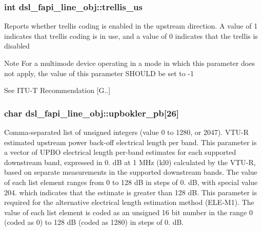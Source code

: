 \hypertarget{structdsl__fapi__line__obj_abb8859a3b3856147be87ac8e0ae7e49a}{
\subsubsection[{trellis\-\_\-us}]{\setlength{\rightskip}{0pt plus 5cm}int dsl\-\_\-fapi\-\_\-line\-\_\-obj\-::trellis\-\_\-us}}\label{structdsl__fapi__line__obj_abb8859a3b3856147be87ac8e0ae7e49a}
Reports whether trellis coding is enabled in the upstream direction. A value of 1 indicates that trellis coding is in use, and a value of 0 indicates that the trellis is disabled \begin{DoxyNote}{Note}
For a multimode device operating in a mode in which this parameter does not apply, the value of this parameter S\-H\-O\-U\-L\-D be set to -\/1 

See I\-T\-U-\/\-T Recommendation \mbox{[}G..\mbox{]} 
\end{DoxyNote}
\hypertarget{structdsl__fapi__line__obj_ae81094c7b07809194b99fac381bb297e}{
\subsubsection[{upbokler\-\_\-pb}]{\setlength{\rightskip}{0pt plus 5cm}char dsl\-\_\-fapi\-\_\-line\-\_\-obj\-::upbokler\-\_\-pb\mbox{[}26\mbox{]}}}\label{structdsl__fapi__line__obj_ae81094c7b07809194b99fac381bb297e}
Comma-\/separated list of unsigned integers (value 0 to 1280, or 2047). V\-T\-U-\/\-R estimated upstream power back-\/off electrical length per band. This parameter is a vector of U\-P\-B\-O electrical length per-\/band estimates for each supported downstream band, expressed in 0. d\-B at 1 M\-Hz (kl0) calculated by the V\-T\-U-\/\-R, based on separate measurements in the supported downstream bands. The value of each list element ranges from 0 to 128 d\-B in steps of 0. d\-B, with special value 204. which indicates that the estimate is greater than 128 d\-B. This parameter is required for the alternative electrical length estimation method (E\-L\-E-\/\-M1). The value of each list element is coded as an unsigned 16 bit number in the range 0 (coded as 0) to 128 d\-B (coded as 1280) in steps of 0. d\-B.

